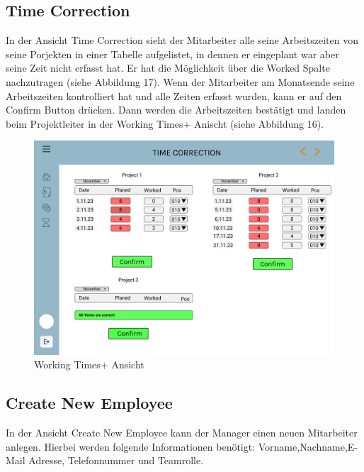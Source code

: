 \documentclass{article}
\begin{document}
\newpage
\clearpage

\subsection{Time Correction}
In der Ansicht Time Correction sieht der Mitarbeiter alle seine Arbeitszeiten
von seine Porjekten in einer Tabelle aufgelistet, in dennen er eingeplant war
aber seine Zeit nicht erfasst hat. Er hat die Möglichkeit über die Worked Spalte
nachzutragen (siehe Abbildung 17). Wenn der Mitarbeiter am Monatsende seine
Arbeitszeiten kontrolliert hat und alle Zeiten erfasst wurden, kann er auf 
den Confirm Button drücken. Dann werden die Arbeitszeiten bestätigt und landen
beim Projektleiter in der Working Times+ Anischt (siehe Abbildung 16).


\begin{figure}[]
    \includegraphics[height= 0.5\textwidth,width= \textwidth]{images/TimeCorrection.png}
    \caption{Working Times+ Ansicht}
    \label{fig:beispiel}
\end{figure}




\subsection{Create New Employee}
In der Ansicht Create New Employee kann der Manager einen neuen Mitarbeiter
anlegen. Hierbei werden folgende Informationen benötigt: Vorname,Nachname,E-Mail Adresse,
Telefonnummer und Teamrolle. 
\end{document}
